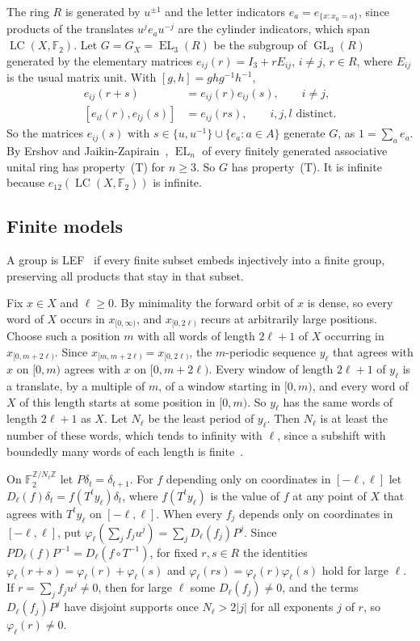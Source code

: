 \documentclass[11pt]{amsart}
\newcommand{\F}{\mathbb F}
\newcommand{\Z}{\mathbb Z}
\newcommand{\LC}{\operatorname{LC}}
\newcommand{\EL}{\operatorname{EL}}
\newcommand{\GL}{\operatorname{GL}}
\begin{document}
The ring $R$ is generated by $u^{\pm1}$ and the letter indicators
$e_a=e_{\{x:x_0=a\}}$, since products of the translates $u^je_au^{-j}$
are the cylinder indicators, which span $\LC(X,\F_2)$. Let
$G=G_X=\EL_3(R)$ be the subgroup of $\GL_3(R)$ generated by the elementary
matrices $e_{ij}(r)=I_3+rE_{ij}$, $i\ne j$, $r\in R$, where $E_{ij}$ is
the usual matrix unit. With $[g,h]=ghg^{-1}h^{-1}$,
\begin{equation}\label{eq:elementary}
 \begin{aligned}
 e_{ij}(r+s)&=e_{ij}(r)e_{ij}(s),\qquad i\ne j,\\
 [e_{il}(r),e_{lj}(s)]&=e_{ij}(rs),\qquad i,j,l\text{ distinct}.
 \end{aligned}
\end{equation}
So the matrices $e_{ij}(s)$ with $s\in\{u,u^{-1}\}\cup\{e_a:a\in A\}$
generate $G$, as $1=\sum_ae_a$. By Ershov and
Jaikin-Zapirain~\cite[Theorem~1.1]{EJZ}, $\EL_n$ of every finitely
generated associative unital ring has property~\textup{(T)} for
$n\ge3$. So $G$ has property~\textup{(T)}. It is infinite because
$e_{12}(\LC(X,\F_2))$ is infinite.

\subsection*{Finite models}
A group is LEF~\cite{VershikGordon} if every finite subset embeds
injectively into a finite group, preserving all products that stay in
that subset.

Fix $x\in X$ and $\ell\ge0$. By minimality the forward orbit of $x$ is
dense, so every word of $X$ occurs in $x_{[0,\infty)}$, and
$x_{[0,2\ell)}$ recurs at arbitrarily large positions. Choose such a
position $m$ with all words of length $2\ell+1$ of $X$ occurring in
$x_{[0,m+2\ell)}$. Since $x_{[m,m+2\ell)}=x_{[0,2\ell)}$, the $m$-periodic
sequence $y_\ell$ that agrees with $x$ on $[0,m)$ agrees with $x$ on
$[0,m+2\ell)$. Every window of length $2\ell+1$ of $y_\ell$ is a
translate, by a multiple of $m$, of a window starting in $[0,m)$, and
every word of $X$ of this length starts at some position in $[0,m)$. So
$y_\ell$ has the same words of length $2\ell+1$ as $X$. Let $N_\ell$ be
the least period of $y_\ell$. Then $N_\ell$ is at least the number of
these words, which tends to infinity with $\ell$, since a subshift with
boundedly many words of each length is finite~\cite{MorseHedlund38}.

On $\F_2^{\Z/N_\ell\Z}$ let $P\delta_t=\delta_{t+1}$. For $f$ depending
only on coordinates in $[-\ell,\ell]$ let
$D_\ell(f)\delta_t=f(T^ty_\ell)\delta_t$, where $f(T^ty_\ell)$ is the value
of $f$ at any point of $X$ that agrees with $T^ty_\ell$ on $[-\ell,\ell]$.
When every $f_j$ depends only on coordinates in $[-\ell,\ell]$, put
$\varphi_\ell(\sum_jf_ju^j)=\sum_jD_\ell(f_j)P^j$. Since
$PD_\ell(f)P^{-1}=D_\ell(f\circ T^{-1})$, for fixed $r,s\in R$ the
identities $\varphi_\ell(r+s)=\varphi_\ell(r)+\varphi_\ell(s)$ and
$\varphi_\ell(rs)=\varphi_\ell(r)\varphi_\ell(s)$ hold for large $\ell$.
If $r=\sum_jf_ju^j\ne0$, then for large $\ell$ some $D_\ell(f_j)\ne0$, and
the terms $D_\ell(f_j)P^j$ have disjoint supports once $N_\ell>2|j|$ for
all exponents $j$ of $r$, so $\varphi_\ell(r)\ne0$.
\end{document}
